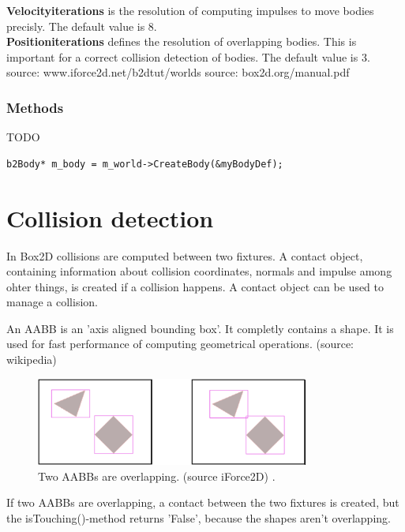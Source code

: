 \documentclass[10pt,a4paper,DIV=11]{scrreprt}
\begin{document}
\textbf{Velocityiterations} is the resolution of computing impulses to move bodies precisly. The default value is 8. \\

\textbf{Positioniterations} defines the resolution of overlapping bodies. This is important for a correct collision detection of bodies. The default value is 3. \\


source: www.iforce2d.net/b2dtut/worlds
source: box2d.org/manual.pdf

\subsubsection*{Methods}
TODO
\begin{lstlisting}[caption={World creates a body},label=lst:world-body]
b2Body* m_body = m_world->CreateBody(&myBodyDef);
\end{lstlisting}

\section{Collision detection}
In Box2D collisions are computed between two fixtures. A contact object, containing information about collision coordinates, normals and impulse among ohter things, is created if a collision happens. A contact object can be used to manage a collision.

An AABB is an 'axis aligned bounding box'. It completly contains a shape. It is used for fast performance of computing geometrical operations. (source: wikipedia)

\begin{center}
	\begin{figure}[H]
		\centering
		\includegraphics[width=0.8\textwidth,scale=1.0]{files/aabbs-crossing.png}  
		\caption{Two AABBs are overlapping. (source iForce2D) \cite{box2d-iforce}.}
		\label{fig:aabbs}
	\end{figure}
\end{center}
If two AABBs are overlapping, a contact between the two fixtures is created, but the isTouching()-method returns 'False', because the shapes aren't overlapping.
\end{document}
